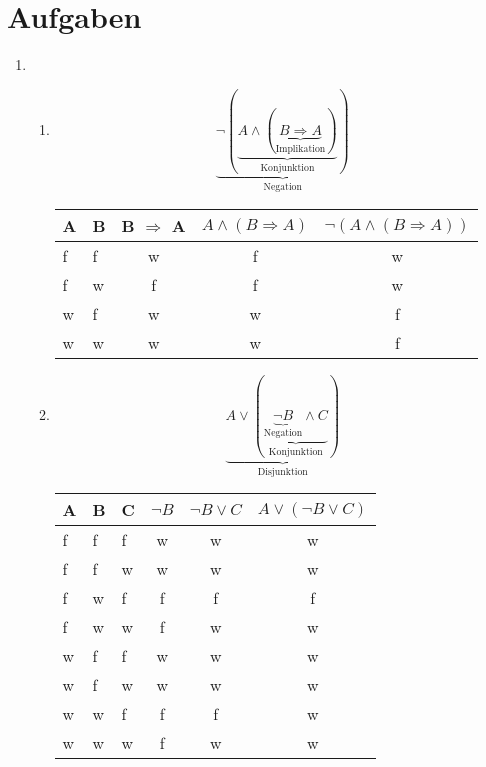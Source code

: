\documentclass[a4paper]{article}
\begin{document}
	\section{Aufgaben}
	
	\begin{enumerate}
		\item
		\begin{enumerate}
			\item
			\begin{equation*}
				\underbrace{\lnot (\underbrace{A \land (\underbrace{B \Rightarrow A}_{\text{Implikation}})}_{\text{Konjunktion}})}_{\text{Negation}}
			\end{equation*}
			\begin{tabular}{|l|l|c|c|c|}
				\firsthline
					A & B & B $\Rightarrow$ A & $A \land (B \Rightarrow A)$ & $\lnot (A \land (B \Rightarrow A))$ \\
				\hline
					f & f & w & f & w \\
					f & w & f & f & w \\
					w & f & w & w & f \\
					w & w & w & w & f \\
				\hline
			\end{tabular}
			
			\item
			\begin{equation*}
				\underbrace{A \lor (\underbrace{\underbrace{\lnot B}_{\text{Negation}} \land C}_{\text{Konjunktion}})}_{\text{Disjunktion}}
			\end{equation*}
			\begin{tabular}{|l|l|l|c|c|c|}
				\firsthline
					A & B & C & $\lnot B$ & $\lnot B \lor C$ & $A \lor (\lnot B \lor C)$ \\
				\hline
					f & f & f & w & w & w \\
					f & f & w & w & w & w \\
					f & w & f & f & f & f \\
					f & w & w & f & w & w \\
					w & f & f & w & w & w \\
					w & f & w & w & w & w \\
					w & w & f & f & f & w \\
					w & w & w & f & w & w \\
				\hline
			\end{tabular}
			

\end{enumerate}
\end{enumerate}
\end{document}
